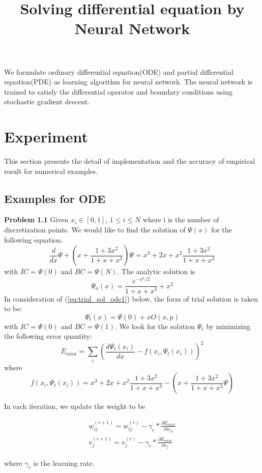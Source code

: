 \documentclass{article}
\begin{document}
	\title{Solving differential equation by Neural Network}
	\maketitle
We formulate ordinary differential equation(ODE) and partial differential equation(PDE) as learning algorithm for neural network. The neural network is trained to satisfy the differential operator and boundary conditions using stochastic gradient descent. 

\tableofcontents
\section{Experiment}
This section presents the detail of implementation and the accuracy of empirical result for numerical examples.

\subsection{Examples for ODE}
\textbf{Problem 1.1}
Given $x_i \in [0,1]$, $1 \leq i \leq N$ where i is the number of discretization points. We would like to find the solution of $\Psi(x)$ for the following equation.   
\[\frac{d}{dx}\Psi + (x+\frac{1+3x^2}{1+x+x^3})\Psi = x^3 +2x +x^{2}\frac{1+3x^2}{1+x+x^3}\]
with $IC =\Psi (0)$  and $BC = \Psi(N)$. 
The analytic solution is 
\[\Psi_{a}(x)=\frac{e ^{-x^2/2}}{1+x+x^3} + x^2\] 
In consideration of (\ref{eq:trial_sol_ode1}) below, the form of trial solution is taken to be: 
\[\Psi_t(x) = \Psi(0) + xO(x,p)\] with $IC =\Psi(0)$ and $BC=\Psi(1)$.
We look for the solution $\Psi_t$ by minimizing the following error quantity:
\[E_\text{error} =  \sum_{i} (\frac{d \Psi_{t}(x_i)}{dx}-f(x_i,\Psi_{t}(x_i)))^2\]
where
\[f(x_i,\Psi_{t}(x_i)) =x^3 +2x +x^{2}\frac{1+3x^2}{1+x+x^3} - (x+\frac{1+3x^2}{1+x+x^3}\Psi)\]

\medskip\noindent
In each iteration, we update the weight to be

\begin{equation}
\begin{aligned}
	w_{ij}^{(r+1)} = w_{ij}^{(r)} - \gamma_{r}*\frac{\partial E_\text{error}}{\partial w_{ij}} \\
	v_{j}^{(r+1)} = v_{j}^{(r)} - \gamma_{r}*\frac{\partial E_\text{error}}{\partial v_{j}}
\end{aligned}
\end{equation}

where $\gamma_r$ is the learning rate. 
\end{document}

